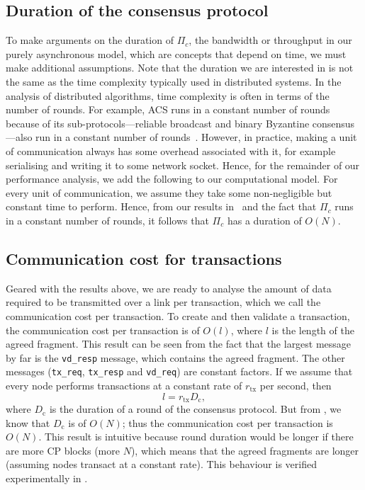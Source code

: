 \subsection{Duration of the consensus protocol}
\label{sec:cons-duration}
To make arguments on the duration of $\Pi_c$, the bandwidth or throughput in our purely asynchronous model,
which are concepts that depend on time,
we must make additional assumptions.
Note that the duration we are interested in is not the same as the time complexity typically used in distributed systems.
In the analysis of distributed algorithms, time complexity is often in terms of the number of rounds.
For example, ACS runs in a constant number of rounds because of its sub-protocols---reliable broadcast and binary Byzantine consensus---also run in a constant number of rounds~\cite{miller2016honey}.
However, in practice, making a unit of communication always has some overhead associated with it, for example serialising and writing it to some network socket.
Hence, for the remainder of our performance analysis, we add the following to our computational model.
For every unit of communication, we assume they take some non-negligible but constant time to perform.
Hence, from our results in~ and the fact that $\Pi_c$ runs in a constant number of rounds,
it follows that $\Pi_c$ has a duration of $O(N)$.

\subsection{Communication cost for transactions}
\label{sec:communication-cost-for-tx}
Geared with the results above,
we are ready to analyse the amount of data required to be transmitted over a link per transaction,
which we call the communication cost per transaction.
To create and then validate a transaction,
the communication cost per transaction is of $O(l)$,
where $l$ is the length of the agreed fragment.
This result can be seen from the fact that the largest message by far is the \texttt{vd\_resp} message,
which contains the agreed fragment.
The other messages (\texttt{tx\_req}, \texttt{tx\_resp} and \texttt{vd\_req}) are constant factors.
If we assume that every node performs transactions at a constant rate of $r_{\text{tx}}$ per second, then
$$l = r_{\text{tx}} D_{\text{c}},$$
where $D_{\text{c}}$ is the duration of a round of the consensus protocol.
But from ,
we know that $D_{\text{c}}$ is of $O(N)$; thus the communication cost per transaction is $O(N)$.
This result is intuitive because round duration would be longer if there are more CP blocks (more $N$), which means that the agreed fragments are longer (assuming nodes transact at a constant rate).
This behaviour is verified experimentally in .


